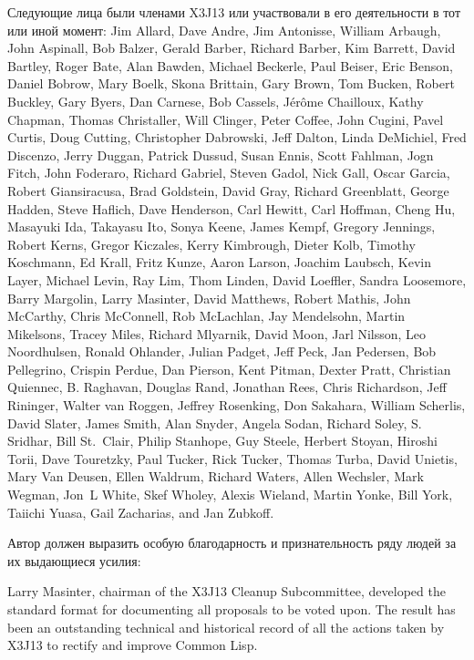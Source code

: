 Следующие лица были членами X3J13 или участвовали в его
деятельности в тот или иной момент:
Jim Allard, Dave Andre, Jim Antonisse, William Arbaugh, John
Aspinall, Bob Balzer, Gerald Barber, Richard Barber, Kim Barrett,
David Bartley, Roger Bate, Alan Bawden, Michael Beckerle, Paul
Beiser, Eric Benson, Daniel Bobrow, Mary Boelk, Skona Brittain, Gary
Brown, Tom Bucken, Robert Buckley, Gary Byers, Dan Carnese, Bob
Cassels, J\'er\^ome Chailloux, Kathy Chapman, Thomas Christaller,
Will Clinger, Peter Coffee, John Cugini, Pavel Curtis, Doug Cutting,
Christopher Dabrowski, Jeff Dalton, Linda DeMichiel, Fred Discenzo,
Jerry Duggan, Patrick Dussud, Susan Ennis, Scott Fahlman, Jogn Fitch,
John Foderaro, Richard Gabriel, Steven Gadol, Nick Gall, Oscar
Garcia, Robert Gian\-sira\-cusa, Brad Goldstein, David Gray, Richard
Greenblatt, George Hadden, Steve Haflich, Dave Henderson, Carl
Hewitt, Carl Hoffman, Cheng Hu, Masayuki Ida, Takayasu Ito, Sonya
Keene, James Kempf, Gregory Jennings, Robert Kerns, Gregor Kiczales,
Kerry Kimbrough, Dieter Kolb, Timothy Koschmann, Ed Krall, Fritz
Kunze, Aaron Larson, Joachim Laubsch, Kevin Layer, Michael Levin, Ray
Lim, Thom Linden, David Loeffler, Sandra Loosemore, Barry Margolin,
Larry Masinter, David Matthews, Robert Mathis, John McCarthy, Chris
McConnell, Rob McLachlan, Jay Mendelsohn, Martin Mikelsons, Tracey
Miles, Richard Mlyarnik, David Moon, Jarl Nilsson, Leo Noordhulsen,
Ronald Ohlander, Julian Padget, Jeff Peck, Jan Pedersen, Bob
Pellegrino, Crispin Perdue, Dan Pierson, Kent Pitman, Dexter Pratt,
Christian Quiennec, B. Raghavan, Douglas Rand, Jonathan Rees, Chris
Richardson, Jeff Rininger, Walter van Roggen, Jeffrey Rosenking,  Don
Sakahara, William Scherlis, David Slater, James Smith, Alan Snyder,
Angela Sodan, Richard Soley, S. Sridhar, Bill St.\ Clair, Philip
Stanhope, Guy Steele, Herbert Stoyan, Hiroshi Torii, Dave Touretzky,
Paul Tucker, Rick Tucker, Thomas Turba, David Unietis, Mary Van
Deusen, Ellen Waldrum, Richard Waters, Allen Wechsler, Mark Wegman,
Jon~L White, Skef Wholey, Alexis Wieland, Martin Yonke, Bill York,
Taiichi Yuasa, Gail Zacharias, and Jan Zubkoff.

Автор должен выразить особую благодарность и признательность ряду
людей за их выдающиеся усилия:

Larry Masinter, chairman of
the X3J13 Cleanup Subcommittee, developed the standard format for
documenting all proposals to be voted upon.  The result has been
an outstanding technical and historical record of all the actions
taken by X3J13 to rectify and improve Common Lisp.

